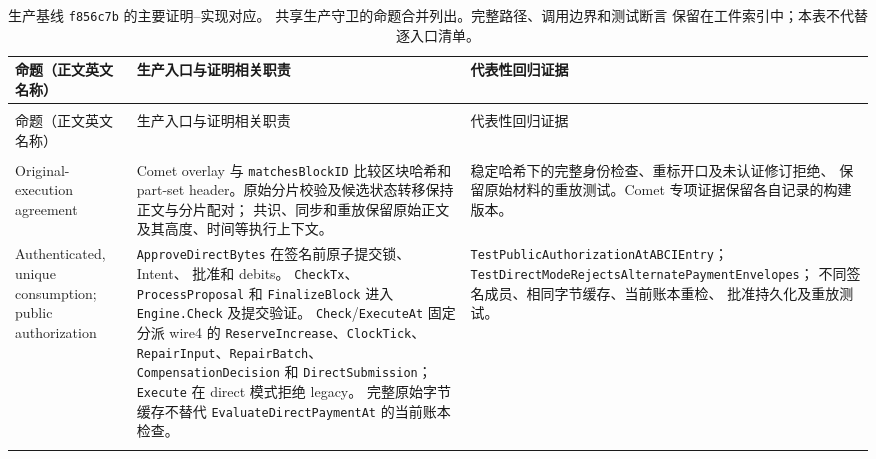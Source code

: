 \begingroup
\small
\setlength{\tabcolsep}{3pt}
\setlength{\LTleft}{0pt}
\setlength{\LTright}{0pt}
\setlength{\LTcapwidth}{\textwidth}
\renewcommand{\arraystretch}{1.10}

\begin{longtable}{@{}
    >{\raggedright\arraybackslash}p{}
    >{\raggedright\arraybackslash}p{}
    >{\raggedright\arraybackslash}p{}
    @{}}
\caption{生产基线 \texttt{f856c7b} 的主要证明--实现对应。
共享生产守卫的命题合并列出。完整路径、调用边界和测试断言
保留在工件索引中；本表不代替逐入口清单。}
\label{tab:proof-implementation}\\
\toprule
命题（正文英文名称） &
生产入口与证明相关职责 &
代表性回归证据 \\
\midrule
\endfirsthead

\multicolumn{3}{@{}l}{表~\thetable\ （续）}\\
\toprule
命题（正文英文名称） &
生产入口与证明相关职责 &
代表性回归证据 \\
\midrule
\endhead

\midrule
\multicolumn{3}{r@{}}{续下页}\\
\endfoot

\bottomrule
\endlastfoot

Original-execution agreement
&
Comet overlay 与 \texttt{matchesBlockID} 比较区块哈希和
part-set header。原始分片校验及候选状态转移保持正文与分片配对；
共识、同步和重放保留原始正文及其高度、时间等执行上下文。
&
稳定哈希下的完整身份检查、重标开口及未认证修订拒绝、
保留原始材料的重放测试。Comet 专项证据保留各自记录的构建版本。
\\
\addlinespace[3pt]

Authenticated, unique consumption;
public authorization
&
\texttt{ApproveDirectBytes} 在签名前原子提交锁、Intent、
批准和 debits。
\texttt{CheckTx}、\texttt{ProcessProposal} 和
\texttt{FinalizeBlock} 进入
\texttt{Engine.Check} 及提交验证。
\texttt{Check}/\texttt{ExecuteAt} 固定分派 wire4 的
\texttt{ReserveIncrease}、\texttt{ClockTick}、
\texttt{RepairInput}、\texttt{RepairBatch}、
\texttt{CompensationDecision} 和 \texttt{DirectSubmission}；
\texttt{Execute} 在 direct 模式拒绝 legacy。
完整原始字节缓存不替代
\texttt{EvaluateDirectPaymentAt} 的当前账本检查。
&
\texttt{TestPublicAuthorization\allowbreak AtABCIEntry}；
\texttt{TestDirectModeRejects\allowbreak AlternatePaymentEnvelopes}；
不同签名成员、相同字节缓存、当前账本重检、
批准持久化及重放测试。
\\
\addlinespace[3pt]


\end{longtable}
